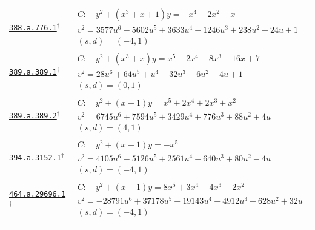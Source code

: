 \documentclass[10pt]{article}
\newcommand{\entryseparator}{\noalign{\vskip3pt\hbox to\linewidth{\leaders\hbox{\kern2pt\rule{3pt}{0.3pt}\kern2pt}\hfill}\nobreak\vskip3pt\nobreak}}
\begin{document}
\begin{landscape}
\begin{longtable}{@{}p{3.4cm}p{\dimexpr\linewidth-3.4cm-2\tabcolsep\relax}@{}}
\entryseparator
\href{https://www.lmfdb.org/Genus2Curve/Q/388/a/776/1}{\texttt{388.a.776.1}}$^{\dagger}$ & $\begin{gathered}C:\quad y^2+\left(x^{3} + x + 1\right)y=-x^{4} + 2 x^{2} + x\\v^2=3577 u^{6} - 5602 u^{5} + 3633 u^{4} - 1246 u^{3} + 238 u^{2} - 24 u + 1\\(s,d)=(-4,1)\end{gathered}$ \\
\entryseparator
\href{https://www.lmfdb.org/Genus2Curve/Q/389/a/389/1}{\texttt{389.a.389.1}}$^{\dagger}$ & $\begin{gathered}C:\quad y^2+\left(x^{3} + x\right)y=x^{5} - 2 x^{4} - 8 x^{3} + 16 x + 7\\v^2=28 u^{6} + 64 u^{5} + u^{4} - 32 u^{3} - 6 u^{2} + 4 u + 1\\(s,d)=(0,1)\end{gathered}$ \\
\entryseparator
\href{https://www.lmfdb.org/Genus2Curve/Q/389/a/389/2}{\texttt{389.a.389.2}}$^{\dagger}$ & $\begin{gathered}C:\quad y^2+\left(x + 1\right)y=x^{5} + 2 x^{4} + 2 x^{3} + x^{2}\\v^2=6745 u^{6} + 7594 u^{5} + 3429 u^{4} + 776 u^{3} + 88 u^{2} + 4 u\\(s,d)=(4,1)\end{gathered}$ \\
\entryseparator
\href{https://www.lmfdb.org/Genus2Curve/Q/394/a/3152/1}{\texttt{394.a.3152.1}}$^{\dagger}$ & $\begin{gathered}C:\quad y^2+\left(x + 1\right)y=-x^{5}\\v^2=4105 u^{6} - 5126 u^{5} + 2561 u^{4} - 640 u^{3} + 80 u^{2} - 4 u\\(s,d)=(-4,1)\end{gathered}$ \\
\entryseparator
\href{https://www.lmfdb.org/Genus2Curve/Q/464/a/29696/1}{\texttt{464.a.29696.1}}$^{\dagger}$ & $\begin{gathered}C:\quad y^2+\left(x + 1\right)y=8 x^{5} + 3 x^{4} - 4 x^{3} - 2 x^{2}\\v^2=-28791 u^{6} + 37178 u^{5} - 19143 u^{4} + 4912 u^{3} - 628 u^{2} + 32 u\\(s,d)=(-4,1)\end{gathered}$ \\
\entryseparator

\end{longtable}
\end{landscape}
\end{document}
